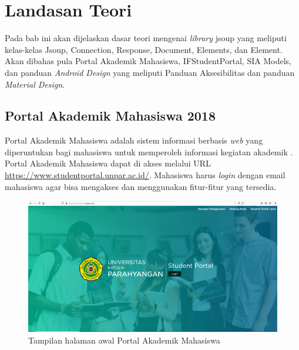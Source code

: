 \chapter{Landasan Teori}
\label{chap:teori}

Pada bab ini akan dijelaskan dasar teori mengenai \textit{library} jsoup yang meliputi kelas-kelas Jsoup, Connection, Response, Document, Elements, dan Element. Akan dibahas pula Portal Akademik Mahasiswa, IFStudentPortal, SIA Models, dan panduan \textit{Android Design} yang meliputi Panduan Aksesibilitas dan panduan \textit{Material Design}.

\section{Portal Akademik Mahasiswa 2018}
Portal Akademik Mahasiswa adalah sistem informasi berbasis \textit{web} yang diperuntukan bagi mahasiswa untuk memperoleh informasi kegiatan akademik \cite{studentportalunpar}. Portal Akademik Mahasiswa dapat di akses melalui URL \url{https://www.studentportal.unpar.ac.id/}. Mahasiswa harus \textit{login} dengan email mahasiswa agar bisa mengakses dan menggunakan fitur-fitur yang tersedia.     

\begin{figure}[H]
	\centering
	\includegraphics[scale=0.3]{DokumenSkripsi/Gambar/stupor.PNG}
	\caption{Tampilan halaman awal Portal Akademik Mahasiswa} 
	\label{fig:studpor_home}
\end{figure}
